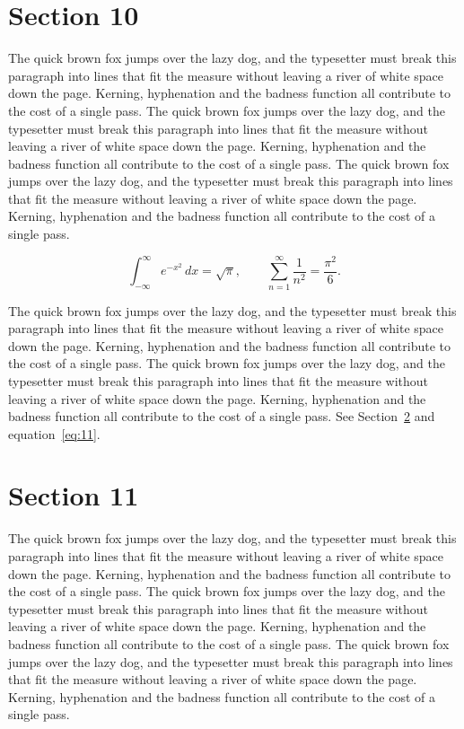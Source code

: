\documentclass{article}
\begin{document}
\section{Section 10}
\label{sec:10}
The quick brown fox jumps over the lazy dog, and the typesetter must break this paragraph into lines that fit the measure without leaving a river of white space down the page. Kerning, hyphenation and the badness function all contribute to the cost of a single pass. The quick brown fox jumps over the lazy dog, and the typesetter must break this paragraph into lines that fit the measure without leaving a river of white space down the page. Kerning, hyphenation and the badness function all contribute to the cost of a single pass. The quick brown fox jumps over the lazy dog, and the typesetter must break this paragraph into lines that fit the measure without leaving a river of white space down the page. Kerning, hyphenation and the badness function all contribute to the cost of a single pass. 

\begin{equation}\label{eq:10}
\int_{-\infty}^{\infty} e^{-x^{2}}\,dx = \sqrt{\pi}, \qquad
\sum_{n=1}^{\infty} \frac{1}{n^{2}} = \frac{\pi^{2}}{6}.
\end{equation}

The quick brown fox jumps over the lazy dog, and the typesetter must break this paragraph into lines that fit the measure without leaving a river of white space down the page. Kerning, hyphenation and the badness function all contribute to the cost of a single pass. The quick brown fox jumps over the lazy dog, and the typesetter must break this paragraph into lines that fit the measure without leaving a river of white space down the page. Kerning, hyphenation and the badness function all contribute to the cost of a single pass. 
See Section~\ref{sec:11} and equation~\eqref{eq:11}.
\section{Section 11}
\label{sec:11}
The quick brown fox jumps over the lazy dog, and the typesetter must break this paragraph into lines that fit the measure without leaving a river of white space down the page. Kerning, hyphenation and the badness function all contribute to the cost of a single pass. The quick brown fox jumps over the lazy dog, and the typesetter must break this paragraph into lines that fit the measure without leaving a river of white space down the page. Kerning, hyphenation and the badness function all contribute to the cost of a single pass. The quick brown fox jumps over the lazy dog, and the typesetter must break this paragraph into lines that fit the measure without leaving a river of white space down the page. Kerning, hyphenation and the badness function all contribute to the cost of a single pass. 
\end{document}
